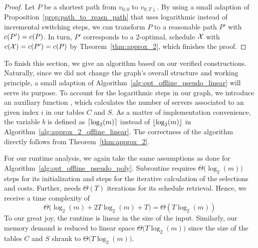 \begin{proof}
Let $P$ be a shortest path from $v_{0,0}$ to $v_{0,T\downarrow}$. By using a small adaption of Proposition~\ref{prop:path_to_reasn_path} that uses logarithmic instead of incremental switching steps, we can transform $P$ to a reasonable path $P'$ with $c(P')=c(P)$.
In turn, $P'$ corresponds to a 2-optimal,  schedule $\mathcal{X}$ with $c(\mathcal{X})=c(P')=c(P)$ by Theorem~\ref{thm:approx_2}, which finishes the proof.
\end{proof}
To finish this section, we give an algorithm based on our verified constructions. Naturally, since we did not change the graph's overall structure and working principle, a small adaption of Algorithm~\ref{alg:opt_offline_pseudo_linear} will serve its purpose. To account for the logarithmic steps in our graph, we introduce an auxiliary function , which calculates the number of servers associated to an given index $i$ in our tables $C$ and $S$. As a matter of implementation convenience, the variable $b$ is defined as $\lceil\log_2(m)\rceil$ instead of $\lfloor\log_2(m)\rfloor$ in Algorithm~\ref{alg:approx_2_offline_linear}.
The correctness of the algorithm directly follows from Theorem~\ref{thm:approx_2}.

For our runtime analysis, we again take the same assumptions as done for Algorithm~\ref{alg:opt_offline_pseudo_poly}. Subroutine  requires $\Theta\bigl(\log_2(m)\bigr)$ steps for its initialization and  steps for the iterative calculation of the selections and costs. Further,  needs $\Theta(T)$ iterations for its schedule retrieval. Hence, we receive a time complexity of
\begin{equation*}
	\Theta\bigl(\log_2(m)+2T\log_2(m)+T\bigr)=\Theta(T\log_2(m))
\end{equation*}
To our great joy, the runtime is linear in the size of the input. Similarly, our memory demand is reduced to linear space $\Theta\bigl(T\log_2(m)\bigr)$ since the size of the tables $C$ and $S$ shrank to $\Theta\bigl(T\log_2(m)\bigr)$.

